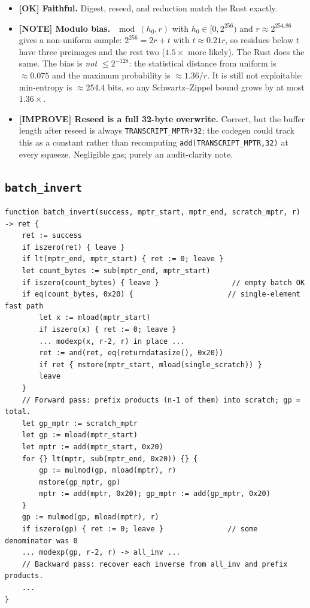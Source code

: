 \begin{itemize}
  \item \textcolor{tracegreen}{\textbf{[OK] Faithful.}} Digest, reseed,
        and reduction match the Rust exactly.
  \item \textcolor{mathpurple}{\textbf{[NOTE] Modulo bias.}}
        $\mod(h_0, r)$ with $h_0 \in [0,2^{256})$ and
        $r \approx 2^{254.86}$ gives a non-uniform sample:
        $2^{256}=2r+t$ with $t\approx0.21r$, so residues below $t$ have
        three preimages and the rest two ($1.5\times$ more likely). The
        Rust does the same.  The bias is \emph{not}
        $\le 2^{-128}$: the statistical distance from uniform is
        $\approx0.075$ and the maximum probability is $\approx1.36/r$.
        It is still not exploitable: min-entropy is $\approx254.4$ bits,
        so any Schwartz--Zippel bound grows by at most $1.36\times$.
  \item \textcolor{codegenblue}{\textbf{[IMPROVE] Reseed is a full
        32-byte overwrite.}} Correct, but the buffer length after reseed
        is always \texttt{TRANSCRIPT\_\allowbreak{}MPTR+32}; the codegen could track
        this as a constant rather than recomputing
        \texttt{add(TRANSCRIPT\_\allowbreak{}MPTR,32)} at every squeeze. Negligible
        gas; purely an audit-clarity note.
\end{itemize}

\subsection{\texttt{batch\_invert}}
\label{sec:batch-invert}

\begin{lstlisting}[style=yul]
function batch_invert(success, mptr_start, mptr_end, scratch_mptr, r) -> ret {
    ret := success
    if iszero(ret) { leave }
    if lt(mptr_end, mptr_start) { ret := 0; leave }
    let count_bytes := sub(mptr_end, mptr_start)
    if iszero(count_bytes) { leave }                 // empty batch OK
    if eq(count_bytes, 0x20) {                      // single-element fast path
        let x := mload(mptr_start)
        if iszero(x) { ret := 0; leave }
        ... modexp(x, r-2, r) in place ...
        ret := and(ret, eq(returndatasize(), 0x20))
        if ret { mstore(mptr_start, mload(single_scratch)) }
        leave
    }
    // Forward pass: prefix products (n-1 of them) into scratch; gp = total.
    let gp_mptr := scratch_mptr
    let gp := mload(mptr_start)
    let mptr := add(mptr_start, 0x20)
    for {} lt(mptr, sub(mptr_end, 0x20)) {} {
        gp := mulmod(gp, mload(mptr), r)
        mstore(gp_mptr, gp)
        mptr := add(mptr, 0x20); gp_mptr := add(gp_mptr, 0x20)
    }
    gp := mulmod(gp, mload(mptr), r)
    if iszero(gp) { ret := 0; leave }               // some denominator was 0
    ... modexp(gp, r-2, r) -> all_inv ...
    // Backward pass: recover each inverse from all_inv and prefix products.
    ...
}
\end{lstlisting}

